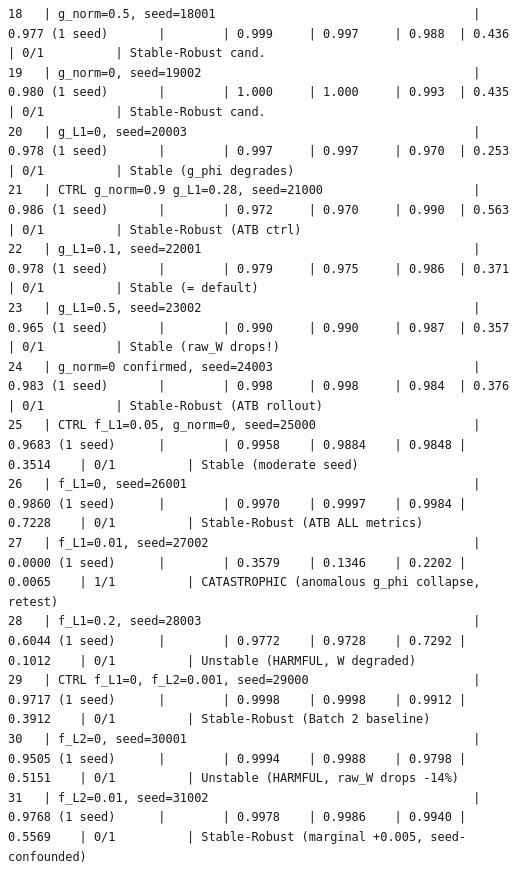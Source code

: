 \begin{tiny}
\begin{verbatim}
18   | g_norm=0.5, seed=18001                                    | 0.977 (1 seed)       |        | 0.999     | 0.997     | 0.988  | 0.436     | 0/1          | Stable-Robust cand.
19   | g_norm=0, seed=19002                                      | 0.980 (1 seed)       |        | 1.000     | 1.000     | 0.993  | 0.435     | 0/1          | Stable-Robust cand.
20   | g_L1=0, seed=20003                                        | 0.978 (1 seed)       |        | 0.997     | 0.997     | 0.970  | 0.253     | 0/1          | Stable (g_phi degrades)
21   | CTRL g_norm=0.9 g_L1=0.28, seed=21000                     | 0.986 (1 seed)       |        | 0.972     | 0.970     | 0.990  | 0.563     | 0/1          | Stable-Robust (ATB ctrl)
22   | g_L1=0.1, seed=22001                                      | 0.978 (1 seed)       |        | 0.979     | 0.975     | 0.986  | 0.371     | 0/1          | Stable (= default)
23   | g_L1=0.5, seed=23002                                      | 0.965 (1 seed)       |        | 0.990     | 0.990     | 0.987  | 0.357     | 0/1          | Stable (raw_W drops!)
24   | g_norm=0 confirmed, seed=24003                            | 0.983 (1 seed)       |        | 0.998     | 0.998     | 0.984  | 0.376     | 0/1          | Stable-Robust (ATB rollout)
25   | CTRL f_L1=0.05, g_norm=0, seed=25000                      | 0.9683 (1 seed)      |        | 0.9958    | 0.9884    | 0.9848 | 0.3514    | 0/1          | Stable (moderate seed)
26   | f_L1=0, seed=26001                                        | 0.9860 (1 seed)      |        | 0.9970    | 0.9997    | 0.9984 | 0.7228    | 0/1          | Stable-Robust (ATB ALL metrics)
27   | f_L1=0.01, seed=27002                                     | 0.0000 (1 seed)      |        | 0.3579    | 0.1346    | 0.2202 | 0.0065    | 1/1          | CATASTROPHIC (anomalous g_phi collapse, retest)
28   | f_L1=0.2, seed=28003                                      | 0.6044 (1 seed)      |        | 0.9772    | 0.9728    | 0.7292 | 0.1012    | 0/1          | Unstable (HARMFUL, W degraded)
29   | CTRL f_L1=0, f_L2=0.001, seed=29000                       | 0.9717 (1 seed)      |        | 0.9998    | 0.9998    | 0.9912 | 0.3912    | 0/1          | Stable-Robust (Batch 2 baseline)
30   | f_L2=0, seed=30001                                        | 0.9505 (1 seed)      |        | 0.9994    | 0.9988    | 0.9798 | 0.5151    | 0/1          | Unstable (HARMFUL, raw_W drops -14%)
31   | f_L2=0.01, seed=31002                                     | 0.9768 (1 seed)      |        | 0.9978    | 0.9986    | 0.9940 | 0.5569    | 0/1          | Stable-Robust (marginal +0.005, seed-confounded)

\end{verbatim}
\end{tiny}
